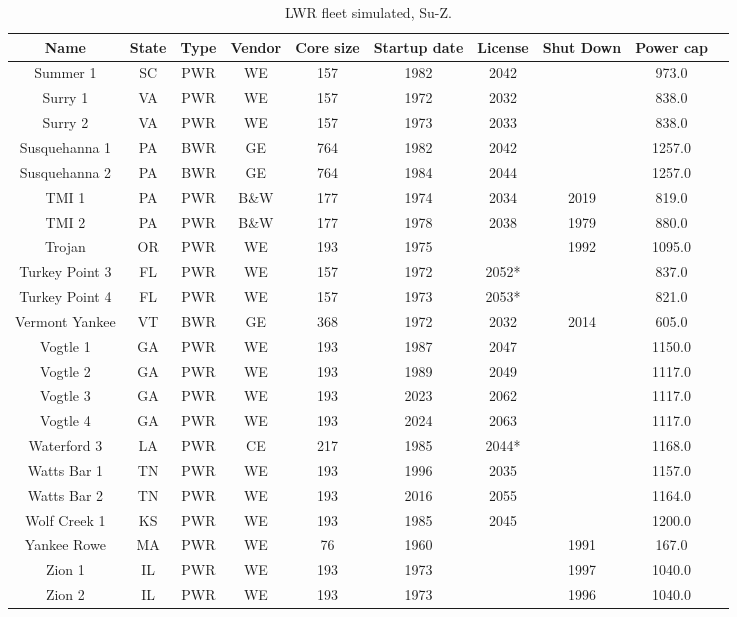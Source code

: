 \begin{table}[H]
    \centering
    \caption{LWR fleet simulated, Su-Z.}
    \label{tab:lwr_fleet3}
    \begin{tabular}{c c c c c c c c c c}
    \hline
    \textbf{Name} & \textbf{State} & \textbf{Type} & \textbf{Vendor} & \textbf{Core size} & \textbf{Startup date} & \textbf{License} & \textbf{Shut Down} & \textbf{Power cap} \\
    \hline
    Summer 1            & SC & PWR & WE   & 157 & 1982 & 2042 &      & 973.0 \\
    Surry 1             & VA & PWR & WE   & 157 & 1972 & 2032 &      & 838.0 \\
    Surry 2             & VA & PWR & WE   & 157 & 1973 & 2033 &      & 838.0 \\
    Susquehanna 1       & PA & BWR & GE   & 764 & 1982 & 2042 &      & 1257.0 \\
    Susquehanna 2       & PA & BWR & GE   & 764 & 1984 & 2044 &      & 1257.0 \\
    TMI 1               & PA & PWR & B\&W & 177 & 1974 & 2034 & 2019 & 819.0 \\
    TMI 2               & PA & PWR & B\&W & 177 & 1978 & 2038 & 1979 & 880.0 \\
    Trojan              & OR & PWR & WE   & 193 & 1975 &      & 1992 & 1095.0 \\
    Turkey Point 3      & FL & PWR & WE   & 157 & 1972 & 2052*&      & 837.0 \\
    Turkey Point 4      & FL & PWR & WE   & 157 & 1973 & 2053*&      & 821.0 \\
    Vermont Yankee      & VT & BWR & GE   & 368 & 1972 & 2032 & 2014 & 605.0 \\
    Vogtle 1            & GA & PWR & WE   & 193 & 1987 & 2047 &      & 1150.0 \\
    Vogtle 2            & GA & PWR & WE   & 193 & 1989 & 2049 &      & 1117.0 \\
    Vogtle 3            & GA & PWR & WE   & 193 & 2023 & 2062 &      & 1117.0 \\
    Vogtle 4            & GA & PWR & WE   & 193 & 2024 & 2063 &      & 1117.0 \\
    Waterford 3         & LA & PWR & CE   & 217 & 1985 & 2044*&      & 1168.0 \\
    Watts Bar 1         & TN & PWR & WE   & 193 & 1996 & 2035 &      & 1157.0 \\
    Watts Bar 2         & TN & PWR & WE   & 193 & 2016 & 2055 &      & 1164.0 \\
    Wolf Creek 1        & KS & PWR & WE   & 193 & 1985 & 2045 &      & 1200.0 \\
    Yankee Rowe         & MA & PWR & WE   & 76  & 1960 &      & 1991 & 167.0 \\
    Zion 1              & IL & PWR & WE   & 193 & 1973 &      & 1997 & 1040.0 \\
    Zion 2              & IL & PWR & WE   & 193 & 1973 &      & 1996 & 1040.0 \\
    \hline
    \end{tabular}
\end{table}

